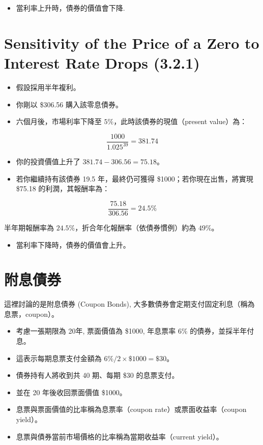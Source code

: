 \documentclass[letterpaper]{article}
\begin{document}
\begin{itemize}
  \item 當利率上升時，債券的價值會下降.
\end{itemize}

\section*{Sensitivity of the Price of a Zero to Interest Rate Drops (3.2.1)}

\begin{itemize}
	\item 假設採用半年複利。
	\item 你剛以 \$306.56 購入該零息債券。
	\item 六個月後，市場利率下降至 \(5\%\)，此時該債券的現值（present value）為：
\end{itemize}

$$
\frac{1000}{1.025^{39}}=381.74
$$

\begin{itemize}
	\item 你的投資價值上升了 \(381.74 - 306.56 = 75.18\)。
	\item 若你繼續持有該債券 19.5 年，最終仍可獲得 \$1000；若你現在出售，將實現 \$75.18 的利潤，其報酬率為：
\end{itemize}

$$
\frac{75.18}{306.56}=24.5 \%
$$

半年期報酬率為 \(24.5\%\)，折合年化報酬率（依債券慣例）約為 \(49\%\)。

\begin{itemize}
	\item 當利率下降時，債券的價值會上升。
\end{itemize}

\section{附息債券}

這裡討論的是附息債券 (Coupon Bonds), 大多數債券會定期支付固定利息（稱為息票，coupon）。

\begin{itemize}
	\item 考慮一張期限為 20年, 票面價值為 \$1000, 年息票率 \(6\%\) 的債券，並採半年付息。
	\item 這表示每期息票支付金額為 \(6\% / 2 \times \$1000 = \$30\)。
	\item 債券持有人將收到共 40 期、每期 \$30 的息票支付。
	\item 並在 20 年後收回票面價值 \$1000。
	\item 息票與票面價值的比率稱為息票率（coupon rate）或票面收益率（coupon yield）。
	\item 息票與債券當前市場價格的比率稱為當期收益率（current yield）。
\end{itemize}
\end{document}
